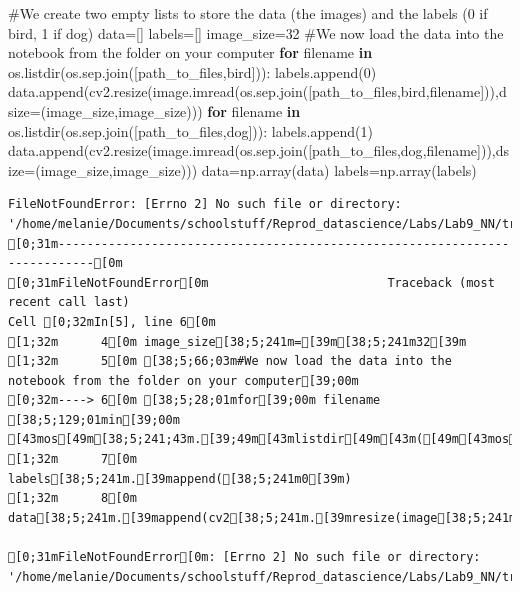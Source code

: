 \documentclass[
  letterpaper,
  DIV=11,
  numbers=noendperiod]{scrartcl}
\newenvironment{Shaded}{\begin{snugshade}}{\end{snugshade}}
\newcommand{\CommentTok}[1]{\textcolor[rgb]{0.37,0.37,0.37}{#1}}
\newcommand{\ControlFlowTok}[1]{\textcolor[rgb]{0.00,0.23,0.31}{\textbf{#1}}}
\newcommand{\DecValTok}[1]{\textcolor[rgb]{0.68,0.00,0.00}{#1}}
\newcommand{\KeywordTok}[1]{\textcolor[rgb]{0.00,0.23,0.31}{\textbf{#1}}}
\newcommand{\NormalTok}[1]{\textcolor[rgb]{0.00,0.23,0.31}{#1}}
\newcommand{\OperatorTok}[1]{\textcolor[rgb]{0.37,0.37,0.37}{#1}}
\newcommand{\StringTok}[1]{\textcolor[rgb]{0.13,0.47,0.30}{#1}}
\begin{document}
\begin{Shaded}
\begin{Highlighting}[]
\CommentTok{\#We create two empty lists to store the data (the images) and the labels (0 if bird, 1 if dog)}
\NormalTok{data}\OperatorTok{=}\NormalTok{[]}
\NormalTok{labels}\OperatorTok{=}\NormalTok{[]}
\NormalTok{image\_size}\OperatorTok{=}\DecValTok{32}
\CommentTok{\#We now load the data into the notebook from the folder on your computer}
\ControlFlowTok{for}\NormalTok{ filename }\KeywordTok{in}\NormalTok{ os.listdir(os.sep.join([path\_to\_files,}\StringTok{\textquotesingle{}bird\textquotesingle{}}\NormalTok{])):}
\NormalTok{    labels.append(}\DecValTok{0}\NormalTok{)}
\NormalTok{    data.append(cv2.resize(image.imread(os.sep.join([path\_to\_files,}\StringTok{\textquotesingle{}bird\textquotesingle{}}\NormalTok{,filename])),dsize}\OperatorTok{=}\NormalTok{(image\_size,image\_size)))}
\ControlFlowTok{for}\NormalTok{ filename }\KeywordTok{in}\NormalTok{ os.listdir(os.sep.join([path\_to\_files,}\StringTok{\textquotesingle{}dog\textquotesingle{}}\NormalTok{])):}
\NormalTok{    labels.append(}\DecValTok{1}\NormalTok{)}
\NormalTok{    data.append(cv2.resize(image.imread(os.sep.join([path\_to\_files,}\StringTok{\textquotesingle{}dog\textquotesingle{}}\NormalTok{,filename])),dsize}\OperatorTok{=}\NormalTok{(image\_size,image\_size)))}
\NormalTok{data}\OperatorTok{=}\NormalTok{np.array(data)}
\NormalTok{labels}\OperatorTok{=}\NormalTok{np.array(labels)}
\end{Highlighting}
\end{Shaded}

\begin{verbatim}
FileNotFoundError: [Errno 2] No such file or directory: '/home/melanie/Documents/schoolstuff/Reprod_datascience/Labs/Lab9_NN/train/bird'
[0;31m---------------------------------------------------------------------------[0m
[0;31mFileNotFoundError[0m                         Traceback (most recent call last)
Cell [0;32mIn[5], line 6[0m
[1;32m      4[0m image_size[38;5;241m=[39m[38;5;241m32[39m
[1;32m      5[0m [38;5;66;03m#We now load the data into the notebook from the folder on your computer[39;00m
[0;32m----> 6[0m [38;5;28;01mfor[39;00m filename [38;5;129;01min[39;00m [43mos[49m[38;5;241;43m.[39;49m[43mlistdir[49m[43m([49m[43mos[49m[38;5;241;43m.[39;49m[43msep[49m[38;5;241;43m.[39;49m[43mjoin[49m[43m([49m[43m[[49m[43mpath_to_files[49m[43m,[49m[38;5;124;43m'[39;49m[38;5;124;43mbird[39;49m[38;5;124;43m'[39;49m[43m][49m[43m)[49m[43m)[49m:
[1;32m      7[0m     labels[38;5;241m.[39mappend([38;5;241m0[39m)
[1;32m      8[0m     data[38;5;241m.[39mappend(cv2[38;5;241m.[39mresize(image[38;5;241m.[39mimread(os[38;5;241m.[39msep[38;5;241m.[39mjoin([path_to_files,[38;5;124m'[39m[38;5;124mbird[39m[38;5;124m'[39m,filename])),dsize[38;5;241m=[39m(image_size,image_size)))

[0;31mFileNotFoundError[0m: [Errno 2] No such file or directory: '/home/melanie/Documents/schoolstuff/Reprod_datascience/Labs/Lab9_NN/train/bird'
\end{verbatim}
\end{document}
